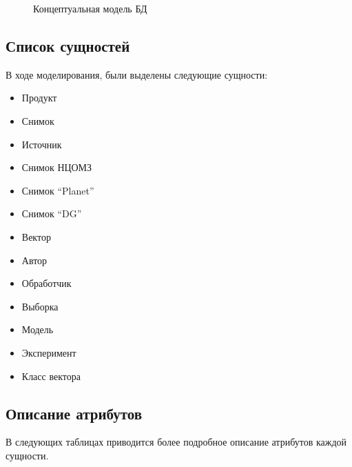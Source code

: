 \documentclass[a4paper]{article}
\begin{document}
\begin{figure}[h]
	\centering
	
	\caption{Концептуальная модель БД}
\end{figure}

\subsection{Список сущностей}
В ходе моделирования, были выделены следующие сущности:
\begin{itemize}
	\item Продукт
	\item Снимок
	\item Источник
	\item Снимок НЦОМЗ
	\item Снимок ``Planet''
	\item Снимок ``DG''
	\item Вектор
	\item Автор
	\item Обработчик
	\item Выборка
	\item Модель
	\item Эксперимент
	\item Класс вектора
\end{itemize}

\subsection{Описание атрибутов}
\label{attributes_definitions}
В следующих таблицах приводится более подробное описание атрибутов каждой сущности.
\end{document}
